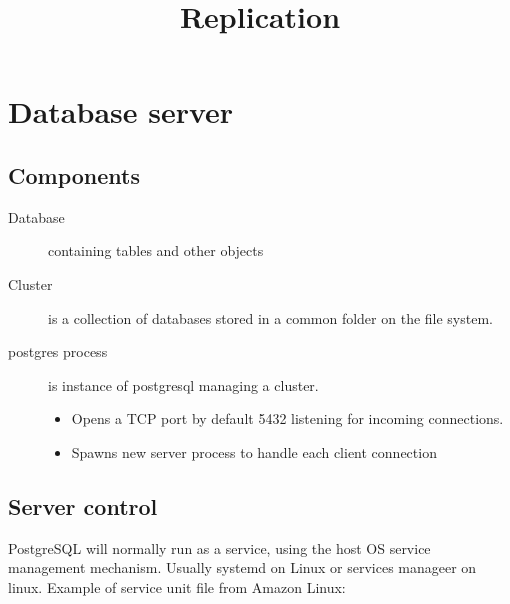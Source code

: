 \documentclass[slides]{pgnotes}
\title{Replication}
\begin{document}
\maketitle


  

\section{Database server}

\subsection{Components}

\begin{description}
\item[Database] containing tables and other objects
\item[Cluster] is a collection of databases stored in a common folder on the file system.
\item[postgres process] is instance of postgresql managing a cluster.
  \begin{itemize}
  \item Opens a TCP port by default 5432 listening for incoming connections.
  \item Spawns new server process to handle each client connection
  \end{itemize}
\end{description}

\subsection{Server control}

PostgreSQL will normally run as a service, using the host OS service management mechanism.
Usually systemd on Linux or services manageer on linux. 
Example of service unit file from Amazon Linux: 
\inputminted{ini}{pgsql.service.txt}
\end{document}
